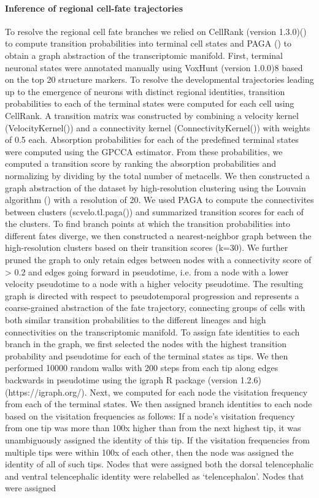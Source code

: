 \paragraph{Inference of regional cell-fate trajectories}
To resolve the regional cell fate branches we relied on CellRank (version 1.3.0)(\cite{lange_cellrank_2022}) to compute transition probabilities into terminal cell states and PAGA (\cite{wolf_scanpy_2018}) to obtain a graph abstraction of the transcriptomic manifold. First, terminal neuronal states were annotated manually using VoxHunt (version 1.0.0)8 based on the top 20 structure markers. To resolve the developmental trajectories leading up to the emergence of neurons with distinct regional identities, transition probabilities to each of the terminal states were computed for each cell using CellRank. A transition matrix was constructed by combining a velocity kernel (VelocityKernel()) and a connectivity kernel (ConnectivityKernel()) with weights of 0.5 each. Absorption probabilities for each of the predefined terminal states were computed using the GPCCA estimator. From these probabilities, we computed a transition score by ranking the absorption probabilities and normalizing by dividing by the total number of metacells. We then constructed a graph abstraction of the dataset by high-resolution clustering using the Louvain algorithm (\cite{blondel_fast_2008}) with a resolution of 20. We used PAGA to compute the connectivites between clusters (scvelo.tl.paga()) and summarized transition scores for each of the clusters. To find branch points at which the transition probabilities into different fates diverge, we then constructed a nearest-neighbor graph between the high-resolution clusters based on their transition scores (k=30). We further pruned the graph to only retain edges between nodes with a connectivity score of > 0.2 and edges going forward in pseudotime, i.e. from a node with a lower velocity pseudotime to a node with a higher velocity pseudotime. The resulting graph is directed with respect to pseudotemporal progression and represents a coarse-grained abstraction of the fate trajectory, connecting groups of cells with both similar transition probabilities to the different lineages and high connectivities on the transcriptomic manifold. To assign fate identities to each branch in the graph, we first selected the nodes with the highest transition probability and pseudotime for each of the terminal states as tips. We then performed 10000 random walks with 200 steps from each tip along edges backwards in pseudotime using the igraph R package (version 1.2.6) (https://igraph.org/). Next, we computed for each node the visitation frequency from each of the terminal states. We then assigned branch identities to each node based on the visitation frequencies as follows: If a node's visitation frequency from one tip was more than 100x higher than from the next highest tip, it was unambiguously assigned the identity of this tip. If the visitation frequencies from multiple tips were within 100x of each other, then the node was assigned the identity of all of such tips. Nodes that were assigned both the dorsal telencephalic and ventral telencephalic identity were relabelled as ‘telencephalon’. Nodes that were assigned 